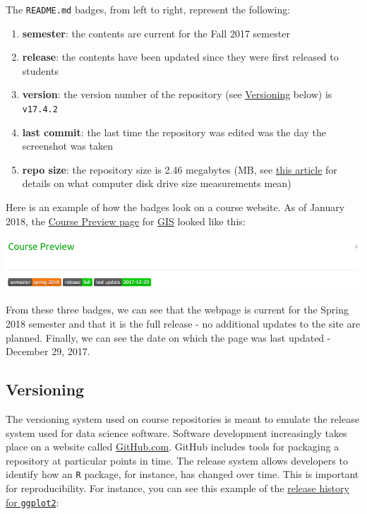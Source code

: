 \documentclass[]{book}
\providecommand{\tightlist}{%
  \setlength{\itemsep}{0pt}\setlength{\parskip}{0pt}}
\theoremstyle{definition}
\theoremstyle{definition}
\theoremstyle{definition}
\theoremstyle{remark}
\begin{document}
The \texttt{README.md} badges, from left to right, represent the
following:

\begin{enumerate}
\def\labelenumi{\arabic{enumi}.}
\tightlist
\item
  \textbf{semester}: the contents are current for the Fall 2017 semester
\item
  \textbf{release}: the contents have been updated since they were first
  released to students
\item
  \textbf{version}: the version number of the repository (see
  \protect\hyperlink{versioning}{Versioning} below) is \texttt{v17.4.2}
\item
  \textbf{last commit}: the last time the repository was edited was the
  day the screenshot was taken
\item
  \textbf{repo size}: the repository size is 2.46 megabytes (MB, see
  \href{https://www.computerhope.com/issues/chspace.htm}{this article}
  for details on what computer disk drive size measurements mean)
\end{enumerate}

Here is an example of how the badges look on a course website. As of
January 2018, the
\href{https://slu-soc5650.github.io/course-preview}{Course Preview page}
for \href{https://slu-soc5650.github.io/}{GIS} looked like this:

\begin{center}\includegraphics[width=0.95\linewidth]{images/webpageBadgesEx} \end{center}

From these three badges, we can see that the webpage is current for the
Spring 2018 semester and that it is the full release - no additional
updates to the site are planned. Finally, we can see the date on which
the page was last updated - December 29, 2017.

\hypertarget{versioning}{\subsection{Versioning}\label{versioning}}

The versioning system used on course repositories is meant to emulate
the release system used for data science software. Software development
increasingly takes place on a website called
\protect\hyperlink{github.com}{GitHub.com}. GitHub includes tools for
packaging a repository at particular points in time. The release system
allows developers to identify how an \texttt{R} package, for instance,
has changed over time. This is important for reproducibility. For
instance, you can see this example of the
\href{https://github.com/tidyverse/ggplot2/releases/tag/v2.2.0}{release
history for \texttt{ggplot2}}:
\end{document}
